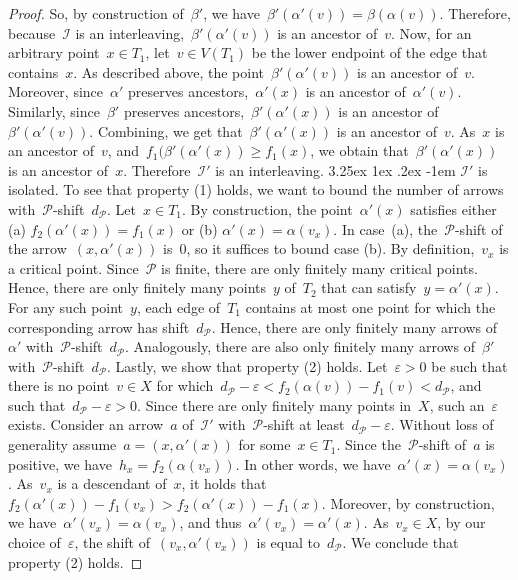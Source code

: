 \documentclass[11pt]{article}
\makeatletter
\newcommand{\resdist}[1]{d_{#1}}
\newcommand{\eps}{\varepsilon}
\newcommand{\I}{\mathcal{I}}
\renewcommand{\P}{\mathcal{P}}
\newcommand{\proofsubparagraph}{\@startsection{subparagraph}{5}{\z@}%
                                       {3.25ex \@plus1ex \@minus .2ex}%
                                       {-1em}%
                                      {\color{lipicsGray}\sffamily\normalsize\bfseries}}
\makeatother
\begin{document}
\begin{proof}
So, by construction of~$\beta'$, we have~$\beta'(\alpha'(v)) = \beta(\alpha(v))$.
Therefore, because~$\I$ is an interleaving,~$\beta'(\alpha'(v))$ is an ancestor of~$v$.
Now, for an arbitrary point~$x \in T_1$, let~$v \in V(T_1)$ be the lower endpoint of the edge that contains~$x$.
As described above, the point~$\beta'(\alpha'(v))$ is an ancestor of~$v$.
Moreover, since~$\alpha'$ preserves ancestors,~$\alpha'(x)$ is an ancestor of~$\alpha'(v)$.
Similarly, since~$\beta'$ preserves ancestors,~$\beta'(\alpha'(x))$ is an ancestor of~$\beta'(\alpha'(v))$.
Combining, we get that~$\beta'(\alpha'(x))$ is an ancestor of~$v$.
As~$x$ is an ancestor of~$v$, and~$f_1(\beta'(\alpha'(x)) \ge f_1(x)$, we obtain that~$\beta'(\alpha'(x))$ is an ancestor of~$x$.
Therefore~$\I'$ is an interleaving.
%
\proofsubparagraph{$\I'$ is isolated.}
To see that property (1) holds, we want to bound the number of arrows with~$\P$-shift~$\resdist{\P}$.
Let~$x \in T_1$.
By construction, the point~$\alpha'(x)$ satisfies either (a) $f_2(\alpha'(x)) = f_1(x)$ or (b) $\alpha'(x) = \alpha(v_x)$.
In case~(a), the~$\P$-shift of the arrow~$(x, \alpha'(x))$ is~$0$, so it suffices to bound case (b).
By definition,~$v_x$ is a critical point.
Since~$\P$ is finite, there are only finitely many critical points.
Hence, there are only finitely many points~$y$ of~$T_2$ that can satisfy~$y = \alpha'(x)$.
For any such point~$y$, each edge of~$T_1$ contains at most one point for which the corresponding arrow has shift~$\resdist{\P}$.
Hence, there are only finitely many arrows of~$\alpha'$ with~$\P$-shift~$\resdist{\P}$.
Analogously, there are also only finitely many arrows of~$\beta'$ with~$\P$-shift~$\resdist{\P}$.
%
Lastly, we show that property (2) holds.
Let~$\eps > 0$ be such that there is no point~$v \in X$ for which~$\resdist{\P} - \eps < f_2(\alpha(v)) - f_1(v) < \resdist{\P}$, and such that~$\resdist{\P} -\eps > 0$.
Since there are only finitely many points in~$X$, such an~$\eps$ exists.
Consider an arrow~$a$ of~$\I'$ with~$\P$-shift at least~$\resdist{\P} - \eps$.
Without loss of generality assume~$a = (x, \alpha'(x))$ for some~$x \in T_1$.
Since the~$\P$-shift of~$a$ is positive, we have~$h_x = f_2(\alpha(v_x))$.
In other words, we have~$\alpha'(x) = \alpha(v_x)$.
As~$v_x$ is a descendant of~$x$, it holds that~$f_2(\alpha'(x)) - f_1(v_x) > f_2(\alpha'(x)) - f_1(x)$.
Moreover, by construction, we have~$\alpha'(v_x) = \alpha(v_x)$, and thus~$\alpha'(v_x) = \alpha'(x)$.
As~$v_x \in X$, by our choice of~$\eps$, the shift of~$(v_x, \alpha'(v_x))$ is equal to~$\resdist{\P}$.
We conclude that property (2) holds.
\end{proof}
%
%
\end{document}
